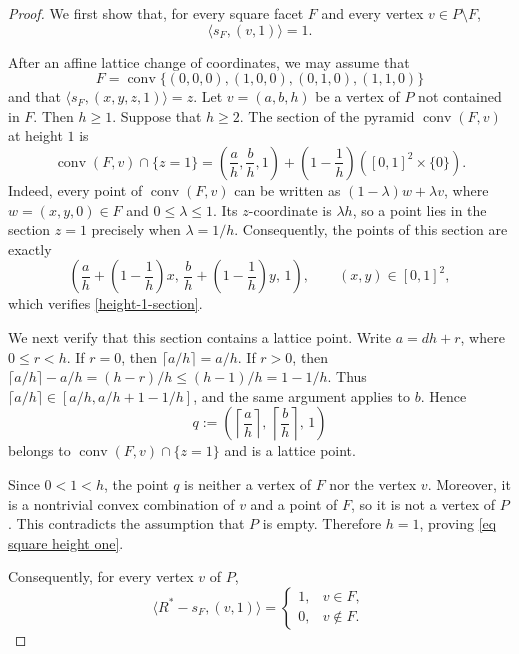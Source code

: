 \documentclass[11pt]{amsart}
\numberwithin{equation}{section}
\theoremstyle{plain}
\theoremstyle{definition}
\newcommand{\0}{$0$-mutable}
\renewcommand{\1}{$1$-rigid}
\renewcommand{\0}{$0$-mutable}
\begin{document}
\begin{proof}
We first show that, for every square facet \(F\) and every vertex
\(v\in P\setminus F\),
\begin{equation}\label{eq square height one}
\langle s_F,(v,1)\rangle=1.
\end{equation}

After an affine lattice change of coordinates, we may assume that
\begin{equation}
\label{height-1-section}
F
=
\operatorname{conv}
\{(0,0,0),(1,0,0),(0,1,0),(1,1,0)\}
\end{equation}
and that
$
\langle s_F,(x,y,z,1)\rangle=z.
$
Let
$
v=(a,b,h)
$
be a vertex of \(P\) not contained in \(F\). Then \(h\geq1\). Suppose
that \(h\geq2\). The section of the pyramid
\(\operatorname{conv}(F,v)\) at height \(1\) is
\[
\operatorname{conv}(F,v)\cap\{z=1\}
=
\left(
\frac{a}{h},
\frac{b}{h},
1
\right)
+
\left(1-\frac1h\right)
([0,1]^2\times\{0\}).
\]
Indeed, every point of \(\operatorname{conv}(F,v)\) can be written as
\((1-\lambda)w+\lambda v\), where \(w=(x,y,0)\in F\) and
\(0\leq\lambda\leq1\). Its \(z\)-coordinate is \(\lambda h\), so a
point lies in the section \(z=1\) precisely when
\(\lambda=1/h\). Consequently, the points of this section are exactly
\[
\left(
\frac{a}{h}+\left(1-\frac1h\right)x,\,
\frac{b}{h}+\left(1-\frac1h\right)y,\,
1
\right),
\qquad (x,y)\in[0,1]^2,
\]
which verifies \eqref{height-1-section}.

We next verify that this section contains a lattice point. Write
\(a=dh+r\), where \(0\leq r<h\). If \(r=0\), then
\(\lceil a/h\rceil=a/h\). If \(r>0\), then
\(\lceil a/h\rceil-a/h=(h-r)/h\leq(h-1)/h=1-1/h\). Thus
\(\lceil a/h\rceil\in[a/h,a/h+1-1/h]\), and the same argument applies
to \(b\). Hence
\[
q:=
\left(
\left\lceil\frac ah\right\rceil,\,
\left\lceil\frac bh\right\rceil,\,
1
\right)
\]
belongs to \(\operatorname{conv}(F,v)\cap\{z=1\}\) and is a lattice
point.




Since \(0<1<h\), the point \(q\) is neither a vertex of \(F\) nor the
vertex \(v\). Moreover, it is a nontrivial convex combination of \(v\)
and a point of \(F\), so it is not a vertex of \(P\). This contradicts
the assumption that \(P\) is empty. Therefore \(h=1\), proving
\eqref{eq square height one}.

Consequently, for every vertex \(v\) of \(P\),
\[
\langle R^*-s_F,(v,1)\rangle
=
\begin{cases}
1, & v\in F,\\
0, & v\notin F.
\end{cases}
\]


\end{proof}
\end{document}
